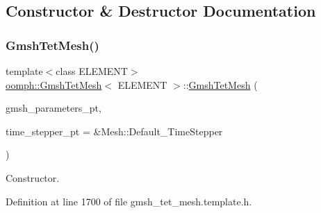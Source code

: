 \subsection{Constructor \& Destructor Documentation}
\mbox{\label{classoomph_1_1GmshTetMesh_a3f9c7d2c2a617f4b497778ff44109dbc}} 
\subsubsection{\texorpdfstring{Gmsh\+Tet\+Mesh()}{GmshTetMesh()}\hspace{0.1cm}{\footnotesize\ttfamily [1/2]}}
{\footnotesize\ttfamily template$<$class E\+L\+E\+M\+E\+NT$>$ \\
\hyperlink{classoomph_1_1GmshTetMesh}{oomph\+::\+Gmsh\+Tet\+Mesh}$<$ E\+L\+E\+M\+E\+NT $>$\+::\hyperlink{classoomph_1_1GmshTetMesh}{Gmsh\+Tet\+Mesh} (\begin{DoxyParamCaption}\item[{\hyperlink{classoomph_1_1GmshParameters}{Gmsh\+Parameters} $\ast$}]{gmsh\+\_\+parameters\+\_\+pt,  }\item[{Time\+Stepper $\ast$}]{time\+\_\+stepper\+\_\+pt = {\ttfamily \&Mesh\+:\+:Default\+\_\+TimeStepper} }\end{DoxyParamCaption})\hspace{0.3cm}{\ttfamily [inline]}}



Constructor. 



Definition at line 1700 of file gmsh\+\_\+tet\+\_\+mesh.\+template.\+h.

\mbox{\label{classoomph_1_1GmshTetMesh_a8b93f46d9a6a442f6d5e9b8e86f33882}} 

